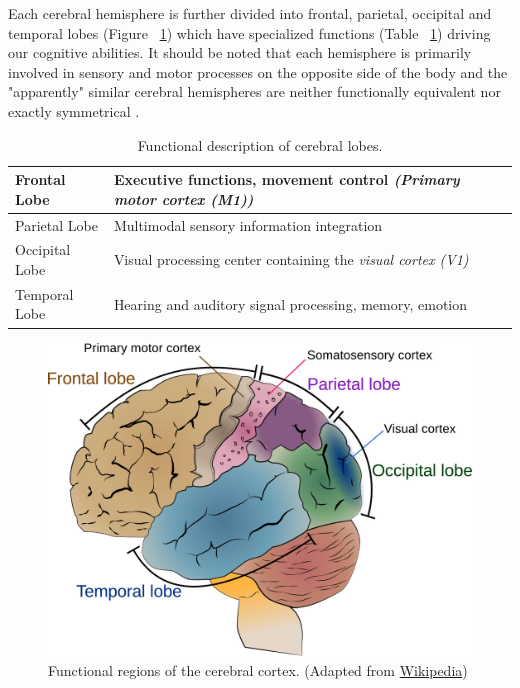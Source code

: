 \documentclass[12pt]{article}
\numberwithin{equation}{section}
\numberwithin{figure}{section}
\numberwithin{table}{section}
\begin{document}
\par{
    Each cerebral hemisphere is further divided
    into frontal, parietal, occipital and temporal lobes (Figure ~\ref{fig:brain_parts})
    which have specialized functions (Table ~\ref{table:brain_functions}) driving our cognitive abilities.
    It should be noted that each hemisphere is primarily involved in sensory and motor processes on
    the opposite side of the body and the "apparently" similar cerebral hemispheres are
    neither functionally equivalent nor exactly symmetrical \citep{kandel_principles_2013}.

\begin{table}[H]
    \footnotesize
    \centering
    \caption{Functional description of cerebral lobes.}
    \begin{tabular}{l l}
        \hline
        Frontal Lobe & Executive functions, movement control \emph{(Primary motor cortex (M1))}\\ \hline
        Parietal Lobe & Multimodal sensory information integration \\ \hline
        Occipital Lobe & Visual processing center containing the \emph{visual cortex (V1)} \\ \hline
        Temporal Lobe & Hearing and auditory signal processing, memory, emotion\\ \hline
    \end{tabular}
    \label{table:brain_functions}
\end{table}

\begin{figure}[ht]
    \centering
    \includegraphics[scale=0.5]{images/Cerebrum_lobes}
    \caption[Functional regions of the cerebral cortex.]{Functional regions of the cerebral cortex. (Adapted from \href{http://en.wikipedia.org/wiki/File:Cerebrum_lobes.svg}{Wikipedia})}
    \label{fig:brain_parts}
\end{figure}
}
\end{document}
